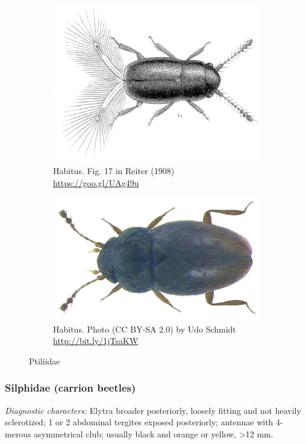 \documentclass[letterpaper, 11pt]{article}
\begin{document}
\begin{figure}[ht!]
  \centering
\begin{subfigure}[ht!]{0.45\textwidth}
    \includegraphics[width=\textwidth]{PtiliidHabitus2}
  \caption{Habitus. Fig. 17 in Reiter (1908) \url{https://goo.gl/UAg49u}}
  \label{fig:ptiliid1}
\end{subfigure}
    \qquad 
\begin{subfigure}[ht!]{0.45\textwidth}
    \includegraphics[width=\textwidth]{ptiliid}
  \caption{Habitus. Photo (CC BY-SA 2.0) by Udo Schmidt \url{http://bit.ly/1jTsaKW}}
  \label{fig:ptiliid2}
\end{subfigure}
    \caption{Ptiliidae}\label{fig:ptiliids}
\end{figure}

\subsubsection{Silphidae (carrion beetles)}
\noindent{}\textit{Diagnostic characters:} Elytra broader posteriorly, loosely fitting and not heavily sclerotized; 1 or 2 abdominal tergites exposed posteriorly; antennae with 4-merous asymmetrical club; usually black and orange or yellow, \textgreater12 mm.
\end{document}
